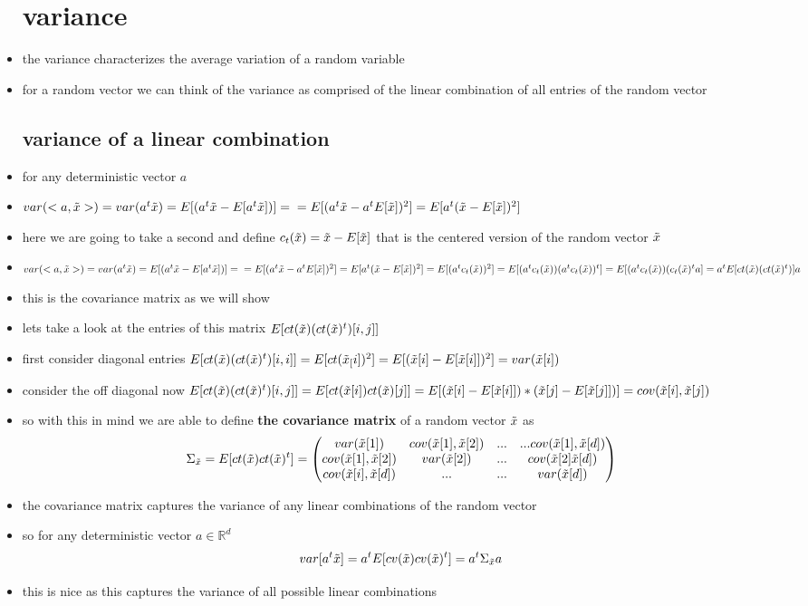 \documentclass{article}
\begin{document}
\begin{itemize}
\section{variance}
\item the variance characterizes the average variation of a random variable
\item for a random vector we can think of the variance as comprised of the linear combination of all entries of the random vector
\subsection*{variance of a linear combination}
\item for any deterministic vector $a$  
\item $var(<a,\Tilde{x}>)=var(a^t\Tilde{x})=E[(a^t\Tilde{x}-E[a^t\Tilde{x}])]=\\
=E[(a^t\Tilde{x}-a^tE[\Tilde{x}])^2] = E[a^t(\tilde{x}-E[\tilde{x}])^2]$
\item here we are going to take a second and define $c_t(\Tilde{x})=\Tilde{x}-E[\Tilde{x}]$ that is the centered version of the random vector  $\Tilde{x}$
\item $var(<a,\Tilde{x}>)=var(a^t\Tilde{x})=E[(a^t\Tilde{x}-E[a^t\Tilde{x}])]=\\
=E[(a^t\Tilde{x}-a^tE[\Tilde{x}])^2] = E[a^t(\tilde{x}-E[\tilde{x}])^2]=E[(a^tc_t(\Tilde{x}))^2]=E[(a^tc_t(\Tilde{x}))(a^tc_t(\Tilde{x}))^{t}]=E[(a^tc_t(\Tilde{x}))(c_t(\Tilde{x})^t a]=a^t E[ct(\Tilde{x}) (ct(\Tilde{x})^t)]a$
\item this is the covariance matrix as we will show 
\item lets take a look at the entries of this matrix $E[ct(\Tilde{x}) (ct(\Tilde{x})^t)[i,j]]$
\item first consider diagonal entries  $E[ct(\Tilde{x}) (ct(\Tilde{x})^t)[i,i]]=E[ct(\Tilde{x}_[i])^2]=E[(\tilde{x}[i]-E[\tilde{x}[i]])^2]=var(\tilde{x}[i])$
\item consider the off diagonal now $E[ct(\Tilde{x}) (ct(\Tilde{x})^t)[i,j]]=E[ct(\Tilde{x}[i]) ct(\tilde{x})[j]]=E[(\Tilde{x}[i]-E[\tilde{x}[i]])*(\Tilde{x}[j]-E[\tilde{x}[j]])]=cov(\Tilde{x}[i],\tilde{x}[j])$
\item so with this in mind we are able to define \textbf{the covariance matrix} of a random vector $\Tilde{x}$ as $$\Sigma_{\tilde{x}}=E[ct(\tilde{x})ct(\tilde{x})^t]=\begin{pmatrix}
    var(\Tilde{x}[1])&cov(\Tilde{x}[1],\tilde{x}[2])&...&...cov(\Tilde{x}[1],\Tilde{x}[d])\\
    cov(\Tilde{x}[1],\Tilde{x}[2])& var(\Tilde{x}[2])&...&cov(\Tilde{x}[2]\Tilde{x}[d])
    \\ cov(\Tilde{x}[i],\tilde{x}[d])&...&... & var(\Tilde{x}[d])
\end{pmatrix}$$
\item the covariance matrix captures the variance of any linear combinations of the random vector
\item so for any deterministic vector $a\in \mathbb{R}^{d}$ $$var[a^t\Tilde{x}]=a^tE[cv(\Tilde{x})cv(\Tilde{x})^t]=a^t\Sigma_{\Tilde{x}}a$$
\item this is nice as this captures the variance of all possible linear combinations

\end{itemize}
\end{document}
